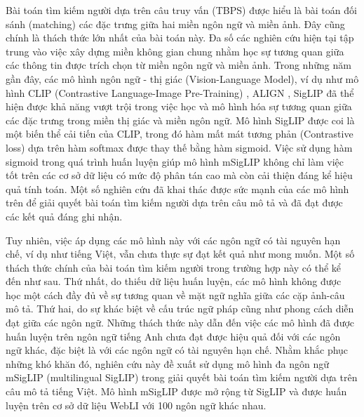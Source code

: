 \documentclass{jstarticle}
\begin{document}
Bài toán tìm kiếm người dựa trên câu truy vấn (TBPS) được hiểu là bài toán đối sánh (matching) các đặc trưng giữa hai miền ngôn ngữ và miền ảnh. Đây cũng chính là thách thức lớn nhất của bài toán này. Đa số các nghiên cứu hiện tại tập trung vào việc xây dựng miền không gian chung nhằm học sự tương quan giữa các thông tin được trích chọn từ miền ngôn ngữ và miền ảnh. Trong những năm gần đây, các mô hình ngôn ngữ - thị giác (Vision-Language Model), ví dụ như mô hình CLIP (Contrastive Language-Image Pre-Training) \cite{radford2021learning}, ALIGN \cite{jia2021scaling}, SigLIP \cite{zhai2023sigmoid} đã thể hiện được khả năng vượt trội trong việc học và mô hình hóa sự tương quan giữa các đặc trưng trong miền thị giác và miền ngôn ngữ. Mô hình SigLIP được coi là một biến thể cải tiến của CLIP, trong đó hàm mất mát tương phản (Contrastive loss) dựa trên hàm softmax được thay thế bằng hàm sigmoid. Việc sử dụng hàm sigmoid trong quá trình huấn luyện giúp mô hình mSigLIP không chỉ làm việc tốt trên các cơ sở dữ liệu có mức độ phân tán cao mà còn cải thiện đáng kể hiệu quả tính toán. Một số nghiên cứu \cite{cao2024empirical,zhai2023sigmoid,cvpr23crossmodal} đã khai thác được sức mạnh của các mô hình trên để giải quyết bài toán tìm kiếm người dựa trên câu mô tả và đã đạt được các kết quả đáng ghi nhận. 

Tuy nhiên, việc áp dụng các mô hình này với các ngôn ngữ có tài nguyên hạn chế, ví dụ như tiếng Việt, vẫn chưa thực sự đạt kết quả như mong muốn. Một số thách thức chính của bài toán tìm kiếm người trong trường hợp này có thể kể đến như sau. Thứ nhất, do thiếu dữ liệu huấn luyện, các mô hình không được học một cách đầy đủ về sự tương quan về mặt ngữ nghĩa giữa các cặp ảnh-câu mô tả.  Thứ hai, do sự khác biệt về cấu trúc ngữ pháp cũng như phong cách diễn đạt giữa các ngôn ngữ. Những thách thức này dẫn đến việc các mô hình đã được huấn luyện trên ngôn ngữ tiếng Anh chưa đạt được hiệu quả đối với các ngôn ngữ khác, đặc biệt là với các ngôn ngữ có tài nguyên hạn chế. Nhằm khắc phục những khó khăn đó, nghiên cứu này đề xuất sử dụng mô hình đa ngôn ngữ mSigLIP (multilingual SigLIP) trong giải quyết bài toán tìm kiếm người dựa trên câu mô tả tiếng Việt. Mô hình mSigLIP được mở rộng từ  SigLIP \cite{zhai2023sigmoid} và được huấn luyện trên cơ sở dữ liệu WebLI \cite{chen2022pali} với 100 ngôn ngữ khác nhau.    
\end{document}
